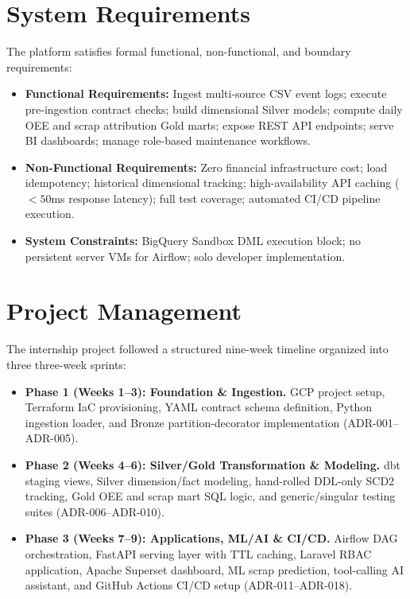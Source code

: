 \documentclass[12pt, a4paper]{report}
\begin{document}
\section{System Requirements}
The platform satisfies formal functional, non-functional, and boundary requirements:
\begin{itemize}
    \item \textbf{Functional Requirements:} Ingest multi-source CSV event logs; execute pre-ingestion contract checks; build dimensional Silver models; compute daily OEE and scrap attribution Gold marts; expose REST API endpoints; serve BI dashboards; manage role-based maintenance workflows.
    \item \textbf{Non-Functional Requirements:} Zero financial infrastructure cost; load idempotency; historical dimensional tracking; high-availability API caching ($<50$ms response latency); full test coverage; automated CI/CD pipeline execution.
    \item \textbf{System Constraints:} BigQuery Sandbox DML execution block; no persistent server VMs for Airflow; solo developer implementation.
\end{itemize}

\section{Project Management}
The internship project followed a structured nine-week timeline organized into three three-week sprints:
\begin{itemize}
    \item \textbf{Phase 1 (Weeks 1--3): Foundation \& Ingestion.} GCP project setup, Terraform IaC provisioning, YAML contract schema definition, Python ingestion loader, and Bronze partition-decorator implementation (ADR-001--ADR-005).
    \item \textbf{Phase 2 (Weeks 4--6): Silver/Gold Transformation \& Modeling.} dbt staging views, Silver dimension/fact modeling, hand-rolled DDL-only SCD2 tracking, Gold OEE and scrap mart SQL logic, and generic/singular testing suites (ADR-006--ADR-010).
    \item \textbf{Phase 3 (Weeks 7--9): Applications, ML/AI \& CI/CD.} Airflow DAG orchestration, FastAPI serving layer with TTL caching, Laravel RBAC application, Apache Superset dashboard, ML scrap prediction, tool-calling AI assistant, and GitHub Actions CI/CD setup (ADR-011--ADR-018).
\end{itemize}
\end{document}
